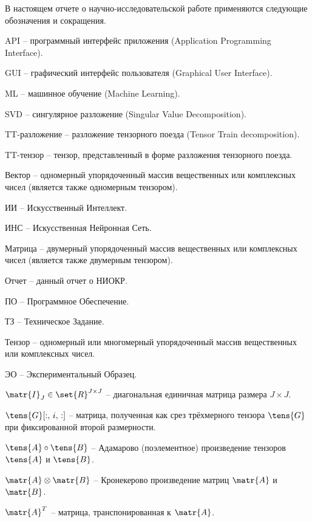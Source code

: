 В настоящем отчете о научно-исследовательской работе применяются следующие обозначения и сокращения.

\vspace{0.4cm}

\newcommand{\abbr}[2]{\begin{flushleft}#1 – #2.\\\end{flushleft}}

\abbr{API}
  {программный интерфейс приложения (Application Programming Interface)}

\abbr{GUI}
  {графический интерфейс пользователя (Graphical User Interface)}

\abbr{ML}
  {машинное обучение (Machine Learning)}

\abbr{SVD}
  {сингулярное разложение (Singular Value Decomposition)}

\abbr{TT-разложение}
  {разложение тензорного поезда (Tensor Train decomposition)}

\abbr{TT-тензор}
  {тензор, представленный в форме разложения тензорного поезда}

\abbr{Вектор}
  {одномерный упорядоченный массив вещественных или комплексных чисел (является также одномерным тензором)}

\abbr{ИИ}
  {Искусственный Интеллект}

\abbr{ИНС}
  {Искусственная Нейронная Сеть}

\abbr{Матрица}
  {двумерный упорядоченный массив вещественных или комплексных чисел (является также двумерным тензором)}

\abbr{Отчет}
  {данный отчет о НИОКР}

\abbr{ПО}
  {Программное Обеспечение}

\abbr{ТЗ}
  {Техническое Задание}

\abbr{Тензор}
  {одномерный или многомерный упорядоченный массив вещественных или комплексных чисел}

\abbr{ЭО}
  {Экспериментальный Образец}

\abbr{$\matr{I}_{J} \in \set{R}^{J \times J}$}
  {диагональная единичная матрица размера $J \times J$}

\abbr{$\tens{G}[:,\,i,\,:]$}
  {матрица, полученная как срез трёхмерного тензора $\tens{G}$ при фиксированной второй размерности}

\abbr{$\tens{A} \circ \tens{B}$}
  {Адамарово (поэлементное) произведение тензоров $\tens{A}$ и $\tens{B}$}

\abbr{$\matr{A} \otimes \matr{B}$}
  {Кронекерово произведение матриц $\matr{A}$ и $\matr{B}$}

\abbr{$\matr{A}^T$}
  {матрица, транспонированная к $\matr{A}$}
